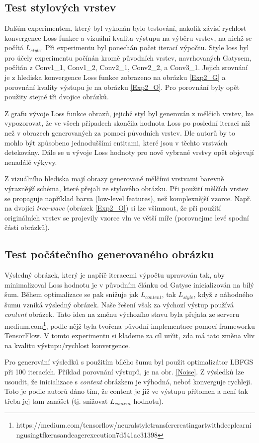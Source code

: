 \documentclass[twocolumn]{article}
\begin{document}
	\subsection*{Test stylových vrstev}
	Dalším experimentem, který byl vykonán bylo testování, nakolik závisí rychlost konvergence Loss funkce a vizuální kvalita výstupu na výběru vrstev, na nichž se počítá $L_{style}$. Při experimentu byl ponechán počet iterací výpočtu. Style loss byl pro účely experimentu počínán kromě původních vrstev, navrhovaných Gatysem, počítán z Conv1\_1, Conv1\_2, Conv2\_1, Conv2\_2, a Conv3\_1.
	Jejich srovnání je z hlediska konvergence Loss funkce zobrazeno na obrázku \ref{Exp2_G} a porovnání kvality výstupu je na obrázku \ref{Exp2_O}. Pro porovnání byly opět použity stejné tři dvojice obrázků.
	\par
	Z grafu vývoje Loss funkce obrazů, jejichž styl byl generován z mělčích vrstev, lze vypozorovat, že ve všech případech skončila hodnota Loss po poslední iteraci níž než v obrazech generovaných za pomocí původních vrstev. Dle autorů by to mohlo být způsobeno jednoduššími entitami, které jsou v těchto vrstvách detekovány. Dále se u vývoje Loss hodnoty pro nově vybrané vrstvy opět objevují nenadálé výkyvy. 
	\par
	Z vizuálního hlediska mají obrazy generované mělčími vrstvami barevně výraznější schéma, které přejali ze stylového obrázku. Při použití mělčích vrstev se propaguje například barva (low-level features), než komplexnější vzorce. Např. na dvojici \textit{tree-wave} (obrázek \ref{Exp2_O}) si lze všimnout, že při použití originálních vrstev se projevily vzorce vln ve větší míře (porovnejme levé spodní části obrázků). 
	 
	\subsection*{Test počátečního generovaného obrázku}
	Výsledný obrázek, který je napříč iteracemi výpočtu upravován tak, aby minimalizoval Loss hodnotu je v původním článku od Gatyse inicializován na bílý šum. Během optimalizace se pak snižuje jak $L_{content}$, tak $L_{style}$, když z náhodného šumu vzniká výsledný obrázek. Naše řešení však za výchozí výstup používá \textit{content} obrázek. Tato idea na změnu výchozího stavu byla přejata ze serveru medium.com\footnote{https://medium.com/tensorflow/neural\-style\-transfer\-creating\-art\-with\-deep\-learning\-using\-tf\-keras\-and\-eager\-execution\-7d541ac31398}, podle nějž byla tvořena původní implementace pomocí frameworku TensorFlow. V tomto experimentu si klademe za cíl určit, zda má tato změna vliv na kvalitu výstupu/rychlost konvergence.
	\par
	Pro generování výsledků s použitím bílého šumu byl použit optimalizátor LBFGS při 100 iteracích. Příklad porovnání výstupů, je na obr. \ref{Noise}. Z výsledků lze usoudit, že inicializace s \textit{content} obrázkem je výhodná, neboť konverguje rychleji. Toto je podle autorů dáno tím, že content je již ve výstupu přítomen a není tak třeba jej tam zanášet (tj. snižovat $L_{content}$ hodnotu).
	
\end{document}
